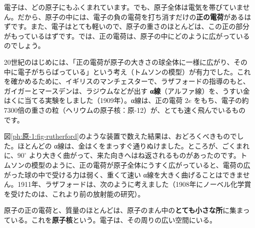 \label{ph:原-1:sec5}
電子は、どの原子にもふくまれています。でも、原子全体は電気を帯びていません。だから、原子の中には、電子の負の電荷を打ち消すだけの\textbf{正の電荷}があるはずです。また、電子はとても軽いので、原子の重さのほとんどは、この正の部分がもっているはずです。では、正の電荷は、原子の中にどのように広がっているのでしょう。

20世紀のはじめには、「正の電荷が原子の大きさの球全体に一様に広がり、その中に電子がちらばっている」という考え（トムソンの模型）が有力でした。これを確かめるために、イギリスのマンチェスターで、ラザフォードの指導のもと、ガイガーとマースデンは、ラジウムなどが出す \textbf{α線}（アルファ線）を、うすい金はくに当てる実験をしました（1909年）。α線は、正の電荷 $2e$ をもち、電子の約7300倍の重さの粒（ヘリウムの原子核：原-12）が、とても速く飛んでいるものです。


図\ref{ph:原-1:fig-rutherford}のような装置で数えた結果は、おどろくべきものでした。ほとんどの α線は、金はくをまっすぐ通りぬけました。ところが、ごくまれに、$90^\circ$ より大きく曲がって、来た向きへはね返されるものがあったのです。トムソンの模型のように、正の電荷が原子全体にうすく広がっていると、電荷の広がった球の中で受ける力は弱く、重くて速い α線を大きく曲げることはできません。1911年、ラザフォードは、次のように考えました（1908年にノーベル化学賞を受けたのは、これより前の放射能の研究）。

\begin{bkcenter}
\begin{minipage}{0.92\linewidth}
原子の正の電荷と、質量のほとんどは、原子のまん中の\textbf{とても小さな所}に集まっている。これを\textbf{原子核}という。電子は、その周りの広い空間にいる。
\end{minipage}
\end{bkcenter}

